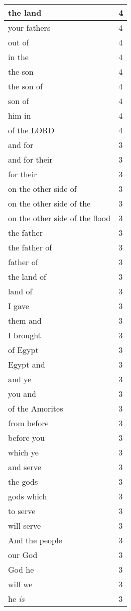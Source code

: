 \begin{center}
\begin{longtable}{|p{3.0in}|p{0.5in}|}
the land & 4\\ \hline 
your fathers & 4\\ \hline 
out of & 4\\ \hline 
in the & 4\\ \hline 
the son & 4\\ \hline 
the son of & 4\\ \hline 
son of & 4\\ \hline 
him in & 4\\ \hline 
of the LORD & 4\\ \hline 
and for & 3\\ \hline 
and for their & 3\\ \hline 
for their & 3\\ \hline 
on the other side of & 3\\ \hline 
on the other side of the & 3\\ \hline 
on the other side of the flood & 3\\ \hline 
the father & 3\\ \hline 
the father of & 3\\ \hline 
father of & 3\\ \hline 
the land of & 3\\ \hline 
land of & 3\\ \hline 
I gave & 3\\ \hline 
them and & 3\\ \hline 
I brought & 3\\ \hline 
of Egypt & 3\\ \hline 
Egypt and & 3\\ \hline 
and ye & 3\\ \hline 
you and & 3\\ \hline 
of the Amorites & 3\\ \hline 
from before & 3\\ \hline 
before you & 3\\ \hline 
which ye & 3\\ \hline 
and serve & 3\\ \hline 
the gods & 3\\ \hline 
gods which & 3\\ \hline 
to serve & 3\\ \hline 
will serve & 3\\ \hline 
And the people & 3\\ \hline 
our God & 3\\ \hline 
God he & 3\\ \hline 
will we & 3\\ \hline 
he \emph{is} & 3\\ \hline 
\end{longtable}
\end{center}





